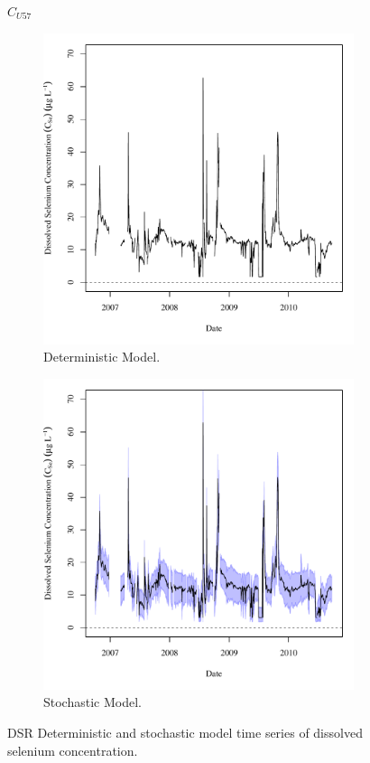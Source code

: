 \subfiguremid
\begin{landscape}
	\begin{figure}
		$ C_{U57} $
		\begin{subfigure}{0.7\textwidth}
			\centering
			\includegraphics[width=\tableCustomSize]{"Figures/Results_DSR/Deterministic/c TS WIL"}
			\caption{Deterministic Model.}
		\end{subfigure}%
		\begin{subfigure}{0.7\textwidth}
			\centering
			\includegraphics[width=\tableCustomSize]{"Figures/Results_DSR/Stochastic/c TS WIL"}
			\caption{Stochastic Model.}
		\end{subfigure}
		\caption{DSR Deterministic and stochastic model time series of dissolved selenium concentration.}
	\end{figure}
\end{landscape}
\subfiguretop

